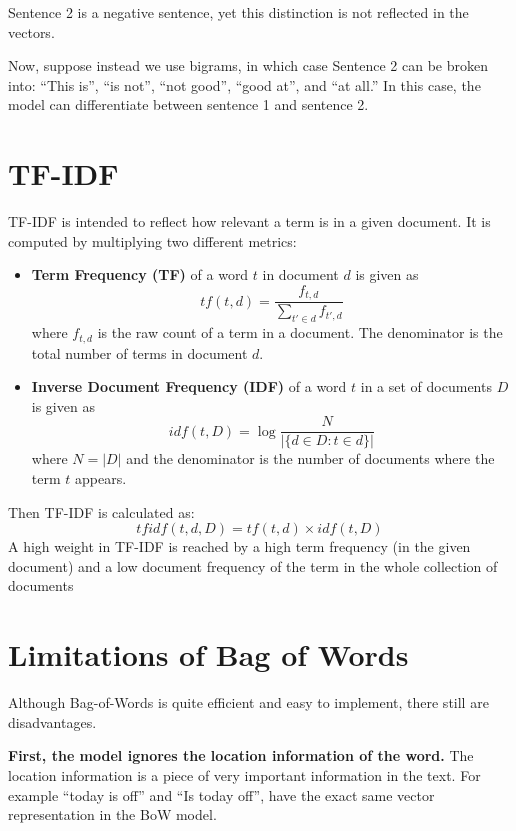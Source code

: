 \documentclass[
]{book}
\begin{document}
Sentence 2 is a negative sentence, yet this distinction is not reflected in the vectors.

Now, suppose instead we use bigrams, in which case Sentence 2 can be broken into: ``This is'', ``is not'', ``not good'', ``good at'', and ``at all.'' In this case, the model can differentiate between sentence 1 and sentence 2.

\hypertarget{tf-idf}{%
\section{TF-IDF}\label{tf-idf}}

TF-IDF is intended to reflect how relevant a term is in a given document. It is computed by multiplying two different metrics:

\begin{itemize}
\item
  \textbf{Term Frequency (TF)} of a word \(t\) in document \(d\) is given as
  \[
  tf(t,d) = \frac{f_{t,d}}{\sum_{t'\in d} f_{t',d}}
  \]
  where \(f_{t,d}\) is the raw count of a term in a document. The denominator is the total number of terms in document \(d\).
\item
  \textbf{Inverse Document Frequency (IDF)} of a word \(t\) in a set of documents \(D\) is given as
  \[
  idf(t,D) = \log\frac{N}{|\{d\in D:t\in d\}|}
  \]
  where \(N=|D|\) and the denominator is the number of documents where the term \(t\) appears.
\end{itemize}

Then TF-IDF is calculated as:
\[
tfidf(t,d,D) = tf(t,d)\times idf(t,D)
\]
A high weight in TF-IDF is reached by a high term frequency (in the given document) and a low document frequency of the term in the whole collection of documents

\hypertarget{limitations-of-bag-of-words}{%
\section{Limitations of Bag of Words}\label{limitations-of-bag-of-words}}

Although Bag-of-Words is quite efficient and easy to implement, there still are disadvantages.

\textbf{First, the model ignores the location information of the word.} The location information is a piece of very important information in the text. For example ``today is off'' and ``Is today off'', have the exact same vector representation in the BoW model.
\end{document}
